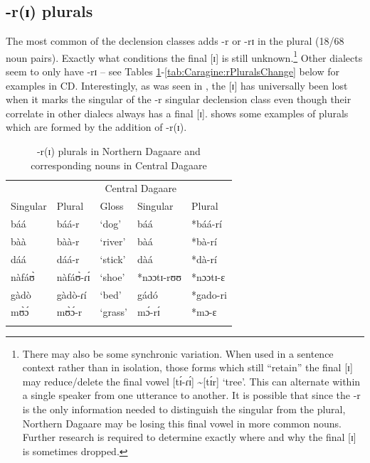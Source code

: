 \documentclass[output=paper,colorlinks,citecolor=brown,
]{langscibook}
\begin{document}
\subsection{-r(ɪ) plurals} \label{sec:caragine:rPlurals}
\largerpage
The most common of the declension classes adds -r or -rɪ in the plural (18/68 noun pairs). Exactly what conditions the final [ɪ] is still unknown.\footnote{There may also be some synchronic variation. When used in a sentence context rather than in isolation, those forms which still ``retain'' the final [ɪ] may reduce/delete the final vowel [tɪ́-ɾɪ́] \sim [tɪ́r] `tree'. This can alternate within a single speaker from one utterance to another. It is possible that since the -r is the only information needed to distinguish the singular from the plural,  Northern Dagaare may be losing this final vowel in more common nouns. Further research is required to determine exactly where and why the final [ɪ] is sometimes dropped.}
Other dialects seem to only have -rɪ \citep{anttilaProsodic2009, anttilaMetrically2019, bodomo2007} -- see Tables \ref{tab:Caragine:rPluralsSame}-\ref{tab:Caragine:rPluralsChange} below for examples in CD. Interestingly, as was seen in , the [ɪ] has universally been lost when it marks the singular of the -r singular declension class even though their correlate in other dialecs always has a final [ɪ].  shows some examples of plurals which are formed by the addition of -r(ɪ).

\begin{table}

  \caption{-r(ɪ) plurals in Northern Dagaare and corresponding nouns in Central Dagaare} 
  \label{tab:Caragine:rPluralsSame}
  
\begin{tabular}{lllll}
\lsptoprule 
\multicolumn{2}{c}{Northern Dagaare} & \multicolumn{1}{c}{}& \multicolumn{2}{c}{Central Dagaare}\\
Singular & Plural & Gloss 
& Singular & Plural \\
\midrule\midrule
báá & báá-r & `dog' & báá & *báá-rí \citep{bodomoStructure1997}\\
bàà & bàà-r & `river' & bàá & *bà-rí \citep{bodomoStructure1997}\\
dáá & dáá-r & `stick' & dàá & *dà-rí \citep{bodomoStructure1997}\\
nàfáʊ̀ & nàfáʊ̀-ɾɪ́ & `shoe' & *nɔɔtɪ-rʊʊ & *nɔɔtɪ-ɛ \\
gàdò & gàdò-ɾí & `bed' & gádó & *gado-ri \\
mʊ̀ɔ́ & mʊ̀ɔ́-r& `grass' & mɔ́-rɪ́ & *mɔ-ɛ\\
\lspbottomrule 

\end{tabular}
\end{table}
\end{document}
